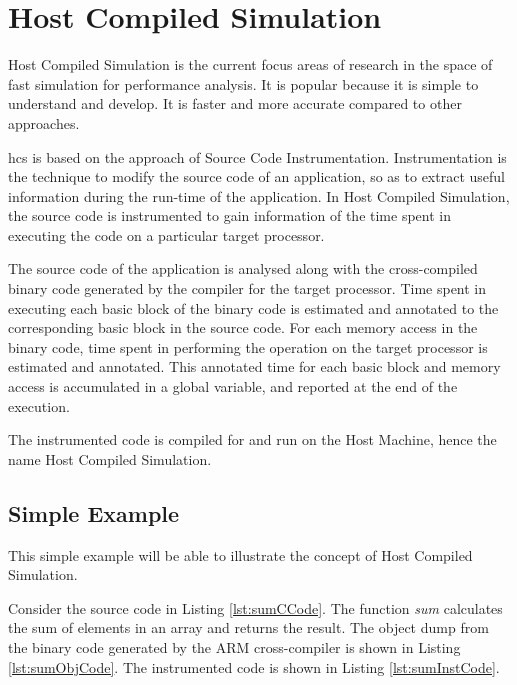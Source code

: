 \chapter{Host Compiled Simulation}

Host Compiled Simulation is the current focus areas of research in the space of fast simulation for performance analysis. It is popular because it is simple to understand and develop. It is faster and more accurate compared to other approaches.

\gls{hcs} is based on the approach of Source Code Instrumentation. Instrumentation is the technique to modify the source code of an application, so as to extract useful information during the run-time of the application. In Host Compiled Simulation, the source code is instrumented to gain information of the time spent in executing the code on a particular target processor.

The source code of the application is analysed along with the cross-compiled binary code generated by the compiler for the target processor. Time spent in executing each basic block of the binary code is estimated and annotated to the corresponding basic block in the source code. For each memory access in the binary code, time spent in performing the operation on the target processor is estimated and annotated. This annotated time for each basic block and memory access is accumulated in a global variable, and reported at the end of the execution. 

The instrumented code is compiled for and run on the Host Machine, hence the name Host Compiled Simulation.

\section{Simple Example}
This simple example will be able to illustrate the concept of Host Compiled Simulation.

Consider the source code in Listing \ref{lst:sumCCode}. The function \textit{sum} calculates the sum of elements in an array and returns the result. The object dump from the binary code generated by the ARM cross-compiler is shown in Listing \ref{lst:sumObjCode}. The instrumented code is shown in Listing \ref{lst:sumInstCode}.

